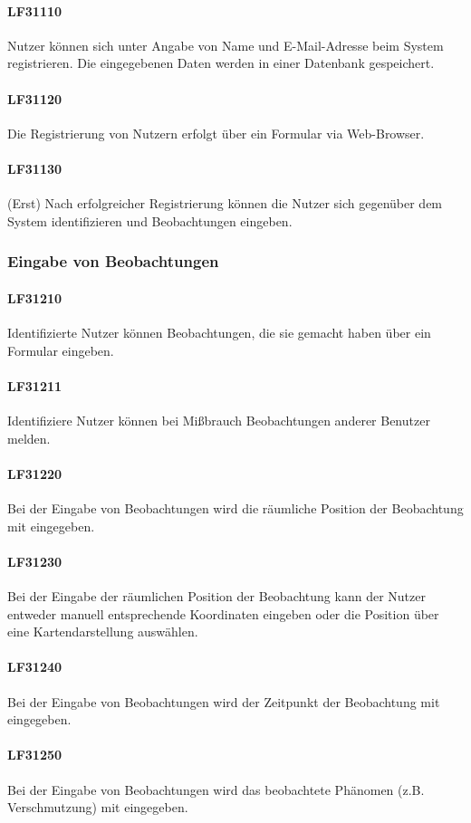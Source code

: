 \documentclass[a4paper,11pt]{scrartcl}
\begin{document}
			\paragraph{LF31110}
				Nutzer können sich unter Angabe von Name und E-Mail-Adresse beim System registrieren.
				Die eingegebenen Daten werden in einer Datenbank gespeichert.
			\paragraph{LF31120}
				Die Registrierung von Nutzern erfolgt über ein Formular via Web-Browser.
			\paragraph{LF31130}
				(Erst) Nach erfolgreicher Registrierung können die Nutzer sich gegenüber dem System identifizieren und Beobachtungen eingeben.
		\subsubsection{Eingabe von Beobachtungen}
			\paragraph{LF31210}
				Identifizierte Nutzer können Beobachtungen, die sie gemacht haben über ein Formular eingeben.
			\paragraph{LF31211}
				Identifiziere Nutzer können bei Mißbrauch Beobachtungen anderer Benutzer melden.
			\paragraph{LF31220}
				Bei der Eingabe von Beobachtungen wird die räumliche Position der Beobachtung mit eingegeben.		
			\paragraph{LF31230}
				Bei der Eingabe der räumlichen Position der Beobachtung kann der Nutzer entweder manuell entsprechende Koordinaten eingeben oder die Position über eine Kartendarstellung auswählen.		
			\paragraph{LF31240}
				Bei der Eingabe von Beobachtungen wird der Zeitpunkt der Beobachtung mit eingegeben.			
			\paragraph{LF31250}
				Bei der Eingabe von Beobachtungen wird das beobachtete Phänomen (z.B. Verschmutzung) mit eingegeben.
\end{document}
